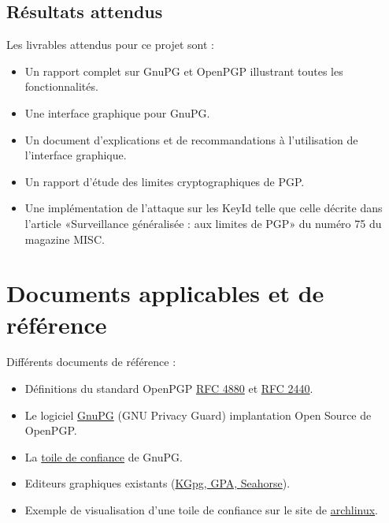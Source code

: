 \documentclass{../res/univ-projet}
\begin{document}
\subsection{Résultats attendus}
Les livrables attendus pour ce projet sont :
\begin{itemize}
 \item Un rapport complet sur GnuPG et OpenPGP illustrant toutes les fonctionnalités.
 \item Une interface graphique pour GnuPG.
 \item Un document d'explications et de recommandations à l'utilisation de l'interface graphique.
 \item Un rapport d'étude des limites cryptographiques de PGP.
 \item Une implémentation de l'attaque sur les KeyId telle que celle décrite dans l'article «Surveillance généralisée : aux limites de PGP» du numéro 75 du magazine MISC.
\end{itemize}

\section{Documents applicables et de référence}
Différents documents de référence :
\begin{itemize}
\item Définitions du standard OpenPGP \href{http://tools.ietf.org/html/rfc4880}{RFC 4880}
  et \href{http://abcdrfc.free.fr/rfc-vf/pdf/rfc2440.pdf}{RFC 2440}.
\item Le logiciel \href{https://www.gnupg.org/}{GnuPG} (GNU Privacy Guard) implantation Open Source
  de OpenPGP.
\item La \href{https://www.gnupg.org/gph/fr/manual.html#AEN541}{toile de confiance} de GnuPG.
\item Editeurs graphiques existants 
  (\href{http://www.gnupg.org/related_software/frontends.en.html}{KGpg, GPA, Seahorse}).
\item Exemple de visualisation d'une toile de confiance sur le site de 
  \href{https://www.archlinux.org/master-keys/#visualization}{archlinux}.
\end{itemize}

\end{document}
